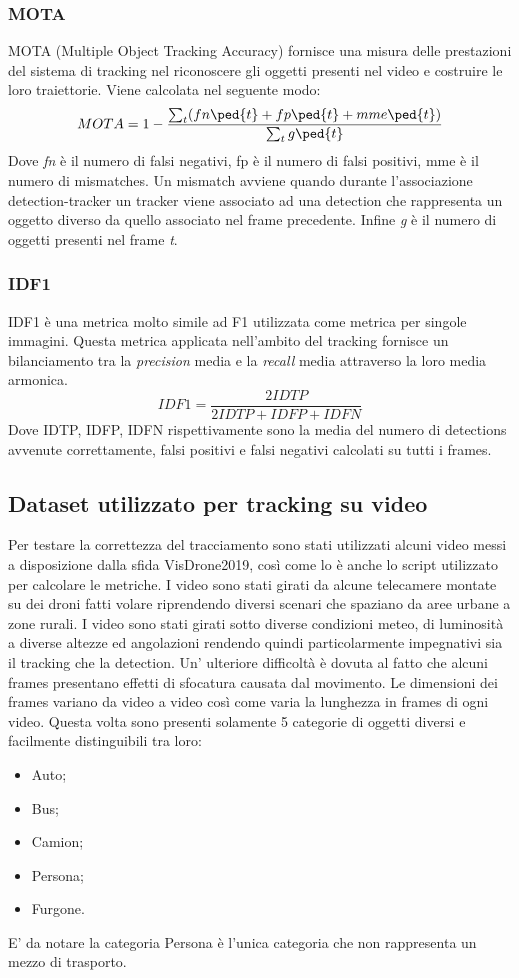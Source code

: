 \subsubsection{MOTA}
MOTA (Multiple Object Tracking Accuracy) fornisce una misura delle prestazioni del sistema di tracking nel riconoscere gli oggetti presenti nel video e costruire le loro traiettorie. Viene calcolata nel seguente modo:
\[
MOTA = 1-\frac{\sum_{t}^{}(fn\ped{t}+fp\ped{t}+mme\ped{t})}{\sum_{t}^{}g\ped{t}}
\]
Dove \textit{fn} è il numero di falsi negativi, fp è il numero di falsi positivi, mme è il numero di mismatches. Un mismatch avviene quando durante l'associazione detection-tracker un tracker viene associato ad una detection che rappresenta un oggetto diverso da quello associato nel frame precedente. Infine  \textit{g} è il numero di oggetti presenti nel frame \textit{t}.
\subsubsection{IDF1}
IDF1 è una metrica molto simile ad F1 utilizzata come metrica per singole immagini. Questa metrica applicata nell'ambito del tracking fornisce un bilanciamento tra la \textit{precision} media e la \textit{recall} media attraverso la loro media armonica. 
\[
IDF1 = \frac{2IDTP}{2IDTP+IDFP+IDFN}
\]
Dove IDTP, IDFP, IDFN rispettivamente sono la media del numero di detections avvenute correttamente, falsi positivi e falsi negativi calcolati su tutti i frames. 

\subsection{Dataset utilizzato per tracking su video}
Per testare la correttezza del tracciamento sono stati utilizzati alcuni video messi a disposizione dalla sfida VisDrone2019, così come lo è anche lo script utilizzato per calcolare le metriche. I video sono stati girati da alcune telecamere montate su dei droni fatti volare riprendendo diversi scenari che spaziano da aree urbane a zone rurali. I video sono stati girati sotto diverse condizioni meteo, di luminosità a diverse altezze ed angolazioni rendendo quindi particolarmente impegnativi sia il tracking che la detection. Un' ulteriore difficoltà è dovuta al fatto che alcuni frames presentano effetti di sfocatura causata dal movimento. Le dimensioni dei frames variano da video a video così come varia la lunghezza in frames di ogni video. Questa volta sono presenti solamente 5 categorie di oggetti diversi e facilmente distinguibili tra loro:
\begin{itemize}
\item Auto;
\item Bus;
\item Camion;
\item Persona;
\item Furgone.
\end{itemize}
E' da notare la categoria Persona è l'unica categoria che non rappresenta un mezzo di trasporto.

